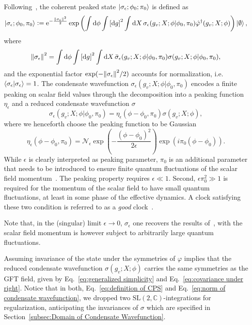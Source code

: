 \documentclass[11pt,a4paper]{article}
\newcommand{\C}{\mathbb C}
\newcommand{\e}{\textrm{e}}
\newcommand{\SL}{\text{SL$(2,\C)$}}
\newcommand{\defeq}{\vcentcolon=}
\begin{document}
Following~\cite{Marchetti:2020umh}, the coherent peaked state $\ket{\sigma_{\epsilon};\phi_0;\pi_0}$ is defined as
%
\begin{equation}\label{eq:definition of CPS}
\ket{\sigma_{\epsilon};\phi_0,\pi_0}
\defeq
\e^{-\frac{\norm{\sigma_{\epsilon}}^2}{2}}\exp\left(\int\dd{\phi}\int\left[\dd{g}\right]^2\int\dd{X}\sigma_{\epsilon}(g_v;X;\phi\vert\phi_0,\pi_0)\hat{\varphi}^{\dagger}(g_v;X;\phi)\right)\ket{\emptyset},
\end{equation}
%
where
%
\begin{equation}\label{eq:norm of condensate wavefunction}
\norm{\sigma_{\epsilon}}^2 
=
\int\dd{\phi}\int\left[\dd{g}\right]^2\int\dd{X} \bar{\sigma}_{\epsilon}(g_v;X;\phi\vert \phi_0,\pi_0)\sigma(g_v;X;\phi\vert \phi_0,\pi_0),
\end{equation}
%
and the exponential factor $\mathrm{exp}(-\norm{\sigma_{\epsilon}}^2/2)$ accounts for normalization, i.e. $\braket{\sigma_{\epsilon}} = 1$. The condensate wavefunction $\sigma_{\epsilon}(g_v;X;\phi\vert\phi_0,\pi_0)$ encodes a finite peaking on scalar field values through the decomposition into a peaking function $\eta_{\epsilon}$ and a reduced condensate wavefunction $\sigma$
%
\begin{equation}
\sigma_{\epsilon}(g_v;X;\phi\vert\phi_0,\pi_0)
=
\eta_{\epsilon}(\phi-\phi_0,\pi_0)\sigma(g_v;X;\phi),
\end{equation}
%
where we henceforth choose the peaking function to be Gaussian
%
\begin{equation}
\eta_{\epsilon}(\phi-\phi_0,\pi_0)
=
\mathcal{N}_{\epsilon}\exp(-\frac{(\phi-\phi_0)^2}{2\epsilon})\exp(i\pi_0(\phi-\phi_0)).
\end{equation}
%
While $\epsilon$ is clearly interpreted as peaking parameter, $\pi_0$ is an additional parameter that needs to be introduced to ensure finite quantum fluctuations of the scalar field momentum~\cite{Marchetti:2020umh}. The peaking property requires $\epsilon\ll 1$. Second, $\epsilon\pi_0^2\gg 1$ is required for the momentum of the scalar field to have small quantum fluctuations, at least in some phase of the effective dynamics. A clock satisfying these two condition is referred to as a \textit{good} clock~\cite{Marchetti:2020umh}. 

Note that, in the (singular) limit $\epsilon\rightarrow 0$, $\sigma_{\epsilon}$ one recovers the  results of~\cite{Oriti:2016qtz}, with the scalar field momentum is however subject to arbitrarily large quantum fluctuations.

Assuming invariance of the state under the symmetries of $\varphi$ implies that the reduced condensate wavefunction $\sigma(g_v;X;\phi)$ carries the same symmetries as the GFT field, given by Eq.~\eqref{eq:generalized simplicity} and Eq.~\eqref{eq:covariance under right}. Notice that in both, Eq.~\eqref{eq:definition of CPS} and Eq.~\eqref{eq:norm of condensate wavefunction}, we dropped two $\SL$-integrations for regularization, anticipating the invariances of $\sigma$ which are specified in Section~\ref{subsec:Domain of Condensate Wavefunction}.
\end{document}
